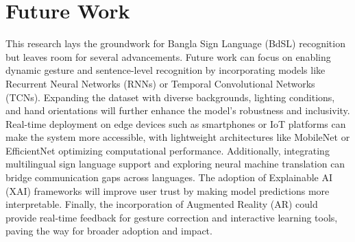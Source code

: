 \section{Future Work}
This research lays the groundwork for Bangla Sign Language (BdSL) recognition but leaves room for several advancements. Future work can focus on enabling dynamic gesture and sentence-level recognition by incorporating models like Recurrent Neural Networks (RNNs) or Temporal Convolutional Networks (TCNs). Expanding the dataset with diverse backgrounds, lighting conditions, and hand orientations will further enhance the model's robustness and inclusivity. Real-time deployment on edge devices such as smartphones or IoT platforms can make the system more accessible, with lightweight architectures like MobileNet or EfficientNet optimizing computational performance. Additionally, integrating multilingual sign language support and exploring neural machine translation can bridge communication gaps across languages. The adoption of Explainable AI (XAI) frameworks will improve user trust by making model predictions more interpretable. Finally, the incorporation of Augmented Reality (AR) could provide real-time feedback for gesture correction and interactive learning tools, paving the way for broader adoption and impact.
\label{sec:sec5_2}